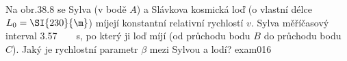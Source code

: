 \begin{fyzexam}{Na obr.38.8 se Sylva (v bodě \(A\)) a Slávkova kosmická loď (o vlastní délce \(L_0 =
  \protect\SI{230}{\protect\m}\)) míjejí konstantní relativní rychlostí \(v\). Sylva měříčasový
  interval \protect\SI{3.57}{\protect\micro\protect\s}, po který ji loď míjí (od průchodu bodu \(B\)
  do průchodu bodu \(C\)). Jaký je rychlostní parametr \(β\) mezi Sylvou a lodí?
  \hfill\cite[s.~1015]{Halliday2001}}{exam016} 

\end{fyzexam}